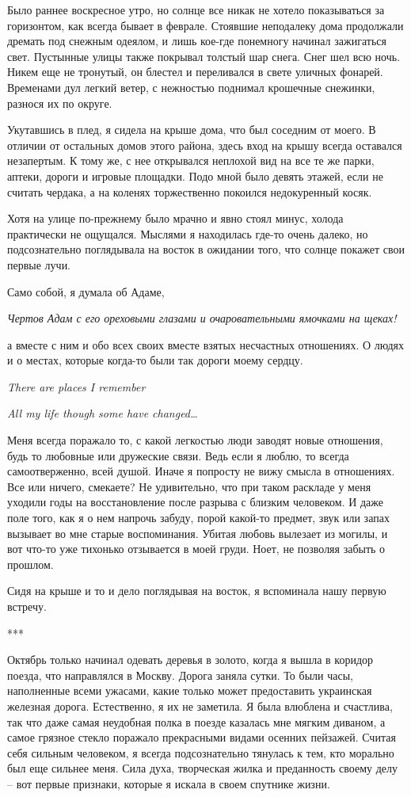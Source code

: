 \documentclass[
]{book}
\begin{document}
Было раннее воскресное утро, но солнце все никак не хотело показываться за горизонтом, как всегда бывает в феврале. Стоявшие неподалеку дома продолжали дремать под снежным одеялом, и лишь кое-где понемногу начинал зажигаться свет. Пустынные улицы также покрывал толстый шар снега. Снег шел всю ночь. Никем еще не тронутый, он блестел и переливался в свете уличных фонарей. Временами дул легкий ветер, с нежностью поднимал крошечные снежинки, разнося их по округе.

Укутавшись в плед, я сидела на крыше дома, что был соседним от моего. В отличии от остальных домов этого района, здесь вход на крышу всегда оставался незапертым. К тому же, с нее открывался неплохой вид на все те же парки, аптеки, дороги и игровые площадки. Подо мной было девять этажей, если не считать чердака, а на коленях торжественно покоился недокуренный косяк.

Хотя на улице по-прежнему было мрачно и явно стоял минус, холода практически не ощущался. Мыслями я находилась где-то очень далеко, но подсознательно поглядывала на восток в ожидании того, что солнце покажет свои первые лучи.

Само собой, я думала об Адаме,

\emph{Чертов Адам с его ореховыми глазами и очаровательными ямочками на щеках!}

а вместе с ним и обо всех своих вместе взятых несчастных отношениях. О людях и о местах, которые когда-то были так дороги моему сердцу.

\emph{There are places I remember}

\emph{All my life though some have changed\ldots{}}

Меня всегда поражало то, с какой легкостью люди заводят новые отношения, будь то любовные или дружеские связи. Ведь если я люблю, то всегда самоотверженно, всей душой. Иначе я попросту не вижу смысла в отношениях. Все или ничего, смекаете? Не удивительно, что при таком раскладе у меня уходили годы на восстановление после разрыва с близким человеком. И даже поле того, как я о нем напрочь забуду, порой какой-то предмет, звук или запах вызывает во мне старые воспоминания. Убитая любовь вылезает из могилы, и вот что-то уже тихонько отзывается в моей груди. Ноет, не позволяя забыть о прошлом.

Сидя на крыше и то и дело поглядывая на восток, я вспоминала нашу первую встречу.

***

Октябрь только начинал одевать деревья в золото, когда я вышла в коридор поезда, что направлялся в Москву. Дорога заняла сутки. То были часы, наполненные всеми ужасами, какие только может предоставить украинская железная дорога. Естественно, я их не заметила. Я была влюблена и счастлива, так что даже самая неудобная полка в поезде казалась мне мягким диваном, а самое грязное стекло поражало прекрасными видами осенних пейзажей. Считая себя сильным человеком, я всегда подсознательно тянулась к тем, кто морально был еще сильнее меня. Сила духа, творческая жилка и преданность своему делу -- вот первые признаки, которые я искала в своем спутнике жизни.
\end{document}
